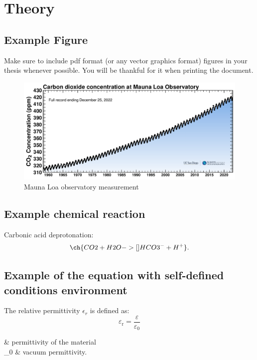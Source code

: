\chapter{Theory}
\label{chapter:theory}


\noindent\lipsum[20-25]

\section{Example Figure}
Make sure to include pdf format (or any vector graphics format) figures in your thesis whenever possible. You will be thankful for it when printing the document. 
\begin{figure}[H]
    \centering
   \includegraphics[width=1.0\textwidth,keepaspectratio,trim=0 0 0 0, clip]{figures/mlo_full_record.pdf}
    \caption{ Mauna Loa observatory  measurement \parencite{keeling-curve} }
    \label{fig:scatter_plot_sand}
\end{figure}


\section{Example chemical reaction}
Carbonic acid deprotonation:
\begin{equation}
    \ch{CO2 + H2O ->[] HCO3^- + H^+}.
\end{equation}

\section{Example of the equation with self-defined conditions environment }
The relative permittivity $\epsilon_{r}$ is defined as: 
\begin{equation}
    \label{eqn:relative_permittivity}
    {\displaystyle \varepsilon _{\mathrm {r} }={\frac {\varepsilon }{\varepsilon _{0}}}}
\end{equation}
\begin{conditions}
    \epsilon & permittivity of the material \\
    \epsilon_0 & vacuum permittivity.\\
\end{conditions}

